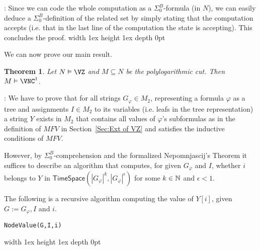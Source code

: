 \documentclass{LMCS}
\newcommand{\Nat}{\ensuremath \mathbb N}
\newcommand{\abs}[1]{\left\vert#1\right\vert}
\newtheorem{theorem}{Theorem}[section]
\newenvironment{proof}{\QuadSpace\par\noindent{\bf
Proof}:}{\EndProof\HalfSpace} \fi
\newcommand{\QuadSpace}{}\newcommand{\HalfSpace}{}\newcommand{\FullSpace}{}\newcommand{\EndProof}{ \hfill \vrule width 1ex height 1ex depth 0pt }
\newenvironment{proof}{

\smallskip
\noindent\emph{Proof.}}{\hfill\(\Box\)
\bigskip
} \fi
\begin{document}
\begin{proof}
  Since we can code the whole computation as a $\Sigma^B_0$-formula (in $N$), we can easily deduce a
  $\Sigma^B_0$-definition of the related set by simply stating that the computation accepts (i.e. that in the
  last line of the computation the state is accepting). This concludes the proof.
\end{proof}


We can now prove our main result.
\begin{theorem}\label{thm:conclusion Nepo}
  Let $N\vDash \VZ$ and $M\subseteq N$ be the polylogarithmic cut. Then
  $M\vDash \VNC^1$.
\end{theorem}


\begin{proof}
  We have to prove that for all strings $G_{\varphi}\in M_2$, representing a formula $\varphi$ as a tree and
  assignments $I\in M_2$ to its variables (i.e. leafs in the tree representation) a string $Y$ exists in $M_2$ that
  contains all values of $\varphi$'s subformulas as in the definition of $MFV$ in Section~\ref{Sec:Ext of VZ}
  and satisfies the inductive conditions of $MFV$.



  However, by $\Sigma^B_0$-comprehension and the formalized
  Nepomnjascij's Theorem it suffices to describe an algorithm that
  computes, for given $G_{\varphi}$ and $I$, whether $i$ belongs to $Y$  in
  $\mathsf{TimeSpace}(\abs{G_{\varphi}}^k,\abs{G_{\varphi}}^{\epsilon})$
  for some $k\in\Nat$ and $\epsilon<1$. 



The following is a recursive algorithm computing the value of $Y[i]$, given $G:=G_{\varphi},I$ and $i$.


\verb"NodeValue(G,I,i)"


\end{proof}
\end{document}
